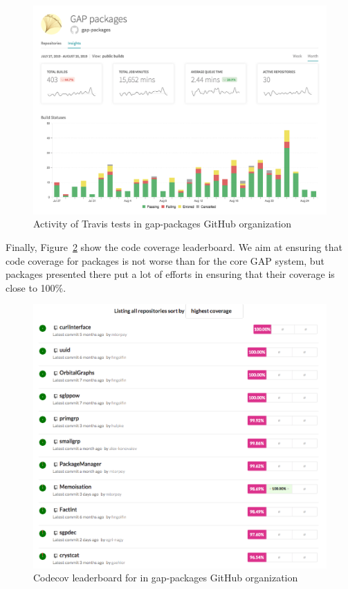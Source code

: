 \begin{figure}[!ht]
    \centering
    \includegraphics[width=\textwidth]{images/gap-packages-travis}
    \caption{Activity of Travis tests in gap-packages GitHub organization}
    \label{fig:gap-packages-travis}
\end{figure}

Finally, Figure~\ref{fig:gap-packages-codecov} show the code coverage
leaderboard. We aim at ensuring that code coverage for packages is 
not worse than for the core GAP system, but packages presented there 
put a lot of efforts in ensuring that their coverage is close to 100\%. 

\begin{figure}[!ht]
    \centering
    \includegraphics[width=\textwidth]{images/gap-packages-codecov}
    \caption{Codecov leaderboard for in gap-packages GitHub organization}
    \label{fig:gap-packages-codecov}
\end{figure}

